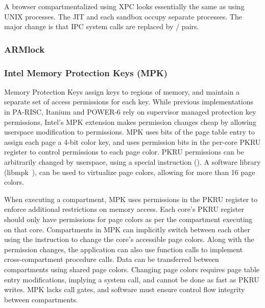 A browser compartmentalized using XPC looks essentially the same as
using UNIX processes. 
The JIT and each sandbox occupy separate processes.
The major change is that IPC system calls are replaced by 
/ pairs.

\subsubsection{ARMlock}

\subsubsection{Intel Memory Protection Keys (MPK)}
Memory Protection Keys assign keys to regions of memory, and maintain
a separate set of access permissions for each key.
While previous implementations in PA-RISC, Itanium and POWER-6 rely on 
supervisor managed protection key permissions, Intel's MPK extension
makes permission changes cheap by allowing userspace modification to
permissions.
MPK uses bits of the page table entry to assign each page a 4-bit color key,
and uses permission bits in the per-core PKRU register to control permissions
to each page color.
PKRU permissions can be arbitrarily changed by userspace, using a special
instruction ().
A software library (libmpk~\cite{ParkLXMK19}), can be used to virtualize 
page colors, allowing for more than 16 page colors.

When executing a compartment, MPK uses permissions in the PKRU register
to enforce additional restrictions on memory access. 
Each core's PKRU register should only have permissions for page colors as
per the compartment executing on that core.
Compartments in MPK can implicitly switch between each other using the 
 instruction to change the core's accessible page colors.
Along with the permission changes, the application can also use 
function calls to implement cross-compartment procedure calls.
Data can be transferred between compartments using shared page colors.
Changing page colors requires page table entry modifications, implying a
system call, and cannot be done as fast as PKRU writes.
MPK lacks call gates, and software must ensure control flow integrity
between compartments.

